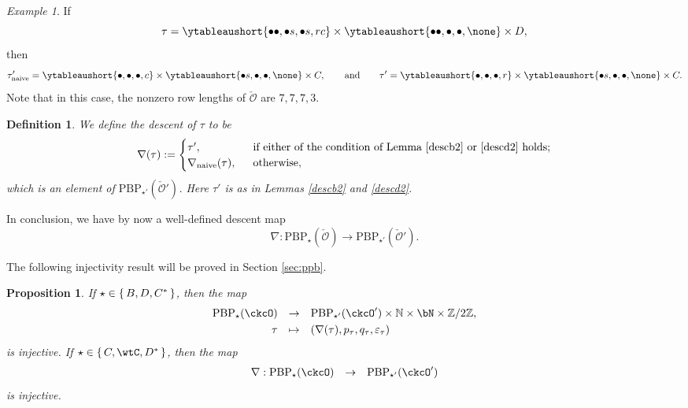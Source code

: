 \documentclass[12pt,a4paper]{amsart}
\newcommand{\BN}{{\mathbb {N}}}
\newcommand{\CO}{{\mathcal {O}}}
\newcommand{\Z}{\mathbb{Z}}
\def\DD{\nabla}
\numberwithin{equation}{section}
\newtheorem{prop}[thm]{Proposition}
\newtheorem{defn}[thm]{Definition}
\theoremstyle{remark}
\newtheorem*{Example}{Example}
\let\ytb=\ytableaushort
\def\ckcOp{\ckcO^{\prime}}
\def\PBP{\mathrm{PBP}}
\begin{document}
\begin{Example}
 If
 \[
 \tau= \ytb{\bullet\bullet, \bullet s, \bullet s, r c} \times \ytb{\bullet\bullet,\bullet,\bullet, \none }\times
  D,
 \]
 then
\[
 \tau'_{\mathrm{naive}}=\ytb{\bullet, \bullet , \bullet ,  c} \times \ytb{\bullet s,\bullet,\bullet, \none } \times
  C,\qquad\textrm{and}\qquad \tau'=\ytb{\bullet, \bullet , \bullet ,  r} \times \ytb{\bullet s,\bullet,\bullet, \none } \times
  C.
 \]
 Note that in this case, the nonzero row lengths of $\check \CO$ are $7,7,7,3$.
\end{Example}

\begin{defn}
We define the descent of $\tau$ to be
\[
  \nabla(\tau):= \begin{cases}
  \tau', & \ \text{ if either of the condition of Lemma \ref{descb2}  or \ref{descd2} holds}; \\
  \nabla_{\mathrm{naive}}( \tau), & \ \text{ otherwise},
\end{cases}
\]
which is an element of $  \mathrm{PBP}_{\star'}(\check \CO')$.
Here $\tau'$ is as in Lemmas  \ref{descb2} and \ref{descd2}.
\end{defn}
In conclusion, we have by now a well-defined descent map
\begin{equation}\label{def:dspbp}
\nabla: \mathrm{PBP}_{\star}(\check \CO)\rightarrow \mathrm{PBP}_{\star'}(\check \CO').
\end{equation}


The following injectivity result will be  proved in Section \ref{sec:ppb}. %

\begin{prop}\label{prop:DD.BDinj}
If $\star \in \set{B, D,C^*}$, then the map
\begin{equation}
  \begin{array}{rcl}
   \PBP_\star(\ckcO)&\rightarrow&
   \PBP_{\star'}(\ckcOp)\times \BN\times \bN\times \Z/2\Z, \smallskip\\
   \tau& \mapsto & (\DD(\tau), p_\tau, q_\tau, \varepsilon_\tau)
   \end{array}
\end{equation}
is injective. If $\star \in  \set{C,\wtC,D^*}$, then the map
\begin{equation}
  \begin{array}{rcl}
  \DD:  \PBP_\star(\ckcO)&\rightarrow&
   \PBP_{\star'}(\ckcOp)
   \end{array}
\end{equation}
is injective.

\end{prop}
\end{document}
